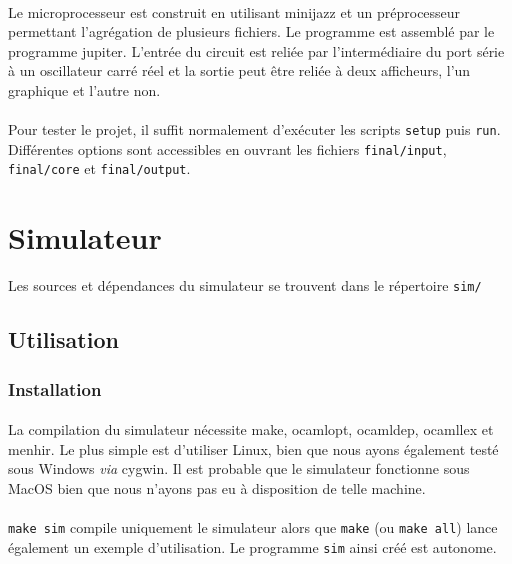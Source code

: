 \documentclass{article}
\begin{document}
\paragraph{}Le microprocesseur est construit en utilisant minijazz et un préprocesseur permettant l'agrégation de plusieurs fichiers. Le programme est assemblé par le programme jupiter. L'entrée du circuit est reliée par l'intermédiaire du port série à un oscillateur carré réel et la sortie peut être reliée à deux afficheurs, l'un graphique et l'autre non.

\paragraph{}Pour tester le projet, il suffit normalement d'exécuter les scripts \texttt{setup} puis \texttt{run}. Différentes options sont accessibles en ouvrant les fichiers \texttt{final/input}, \texttt{final/core} et \texttt{final/output}.

\section{Simulateur}

Les sources et dépendances du simulateur se trouvent dans le répertoire \texttt{sim/}


\subsection{Utilisation}
\subsubsection{Installation}
\paragraph{}La compilation du simulateur nécessite make, ocamlopt, ocamldep, ocamllex et menhir. Le plus simple est d'utiliser Linux, bien que nous ayons également testé sous Windows \emph{via} cygwin. Il est probable que le simulateur fonctionne sous MacOS bien que nous n'ayons pas eu à disposition de telle machine.

\paragraph{}\texttt{make sim} compile uniquement le simulateur alors que \texttt{make} (ou \texttt{make all}) lance également un exemple d'utilisation. Le programme \texttt{sim} ainsi créé est autonome.
\end{document}
